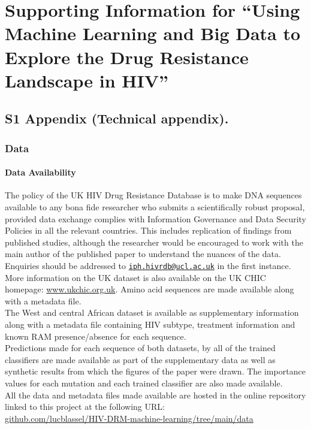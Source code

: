 \documentclass[
  11pt,
  twoside]{scrbook}
\begin{document}
\hypertarget{HIV-appendix}{%
\chapter{Supporting Information for ``Using Machine Learning and Big Data to Explore the Drug Resistance Landscape in HIV''}\label{HIV-appendix}}

\hypertarget{S1-Appendix}{%
\section{S1 Appendix (Technical appendix).}\label{S1-Appendix}}

\hypertarget{data-appendix}{%
\subsection{Data}\label{data-appendix}}

\hypertarget{data-availability}{%
\subsubsection{Data Availability}\label{data-availability}}

The policy of the UK HIV Drug Resistance Database is to make DNA sequences available to any bona fide researcher who submits a scientifically robust proposal, provided data exchange complies with Information Governance and Data Security Policies in all the relevant countries. This includes replication of findings from published studies, although the researcher would be encouraged to work with the main author of the published paper to understand the nuances of the data. Enquiries should be addressed to \href{mailto:iph.hivrdb@ucl.ac.uk}{\nolinkurl{iph.hivrdb@ucl.ac.uk}} in the first instance. More information on the UK dataset is also available on the UK CHIC homepage: \href{http://www.ukchic.org.uk/}{www.ukchic.org.uk}. Amino acid sequences are made available along with a metadata file.\\
The West and central African dataset is available as supplementary information along with a metadata file containing HIV subtype, treatment information and known RAM presence/absence for each sequence.\\
Predictions made for each sequence of both datasets, by all of the trained classifiers are made available as part of the supplementary data as well as synthetic results from which the figures of the paper were drawn. The importance values for each mutation and each trained classifier are also made available.\\
All the data and metadata files made available are hosted in the online repository linked to this project at the following URL:\\
\href{https://github.com/lucblassel/HIV-DRM-machine-learning/tree/main/data}{github.com/lucblassel/HIV-DRM-machine-learning/tree/main/data}
\end{document}
